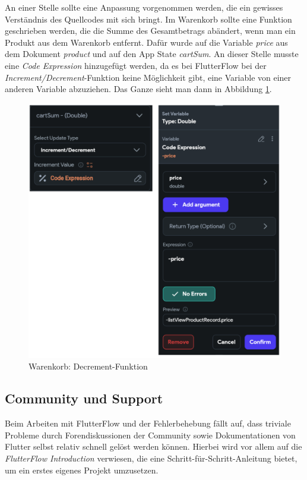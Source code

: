 \documentclass[acmtog, language=ngerman]{acmart}
\begin{document}
An einer Stelle sollte eine Anpassung vorgenommen werden, die ein gewisses Verständnis des Quellcodes mit sich bringt.
Im Warenkorb sollte eine Funktion geschrieben werden, die die Summe des Gesamtbetrags abändert, wenn man ein Produkt aus dem Warenkorb entfernt. Dafür wurde auf die Variable \textit{price} aus dem Dokument \textit{product} und auf den App State \textit{cartSum}. An dieser Stelle musste eine \textit{Code Expression} hinzugefügt werden, da es bei FlutterFlow bei der \textit{Increment/Decrement}-Funktion keine Möglichkeit gibt, eine Variable von einer anderen Variable abzuziehen. Das Ganze sieht man dann in Abbildung \ref{fig:decrement_fct}.
\begin{figure}[h]
    \centering
    \includegraphics[width=1\linewidth]{images/FF_decrement.png}
    \caption{Warenkorb: Decrement-Funktion}
    \label{fig:decrement_fct}
\end{figure}
\subsection{Community und Support}
Beim Arbeiten mit FlutterFlow und der Fehlerbehebung fällt auf, dass triviale Probleme durch Forendiskussionen der Community sowie Dokumentationen von Flutter selbst relativ schnell gelöst werden können. Hierbei wird vor allem auf die \textit{FlutterFlow Introduction} \cite{flutterflow_doc}verwiesen, die eine Schritt-für-Schritt-Anleitung bietet, um ein erstes eigenes Projekt umzusetzen.
\end{document}

